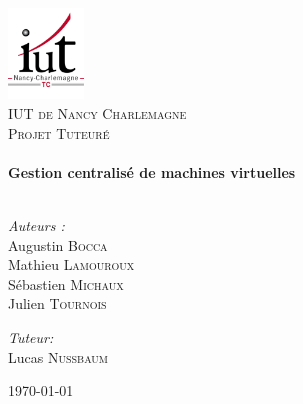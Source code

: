 \begin{titlepage}

\begin{center}


\includegraphics[width=0.15\textwidth]{images/logo_iut.png}\\[1cm]    

\textsc{\LARGE IUT de Nancy Charlemagne}\\[1.5cm]

\textsc{\Larg Projet Tuteuré}\\[0.5cm]


\HRule \\[0.4cm]
{ \huge \bfseries Gestion centralisé de machines virtuelles}\\[0.4cm]

\HRule \\[1.5cm]

\begin{minipage}{0.4\textwidth}
\begin{flushleft} \large
\emph{Auteurs :}\\
Augustin \textsc{Bocca}\\
Mathieu \textsc{Lamouroux}\\
Sébastien \textsc{Michaux}\\
Julien \textsc{Tournois}
\end{flushleft}
\end{minipage}
\begin{minipage}{0.4\textwidth}
\begin{flushright} \large
\emph{Tuteur:} \\
Lucas \textsc{Nussbaum}
\end{flushright}
\end{minipage}

\vfill

{\large \today}

\end{center}

\end{titlepage}
